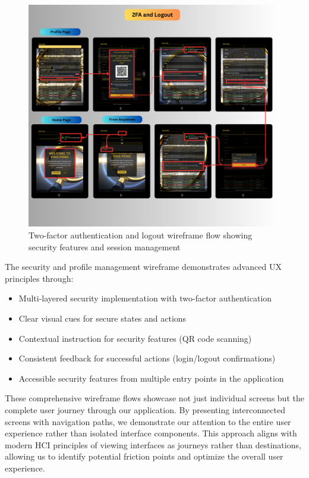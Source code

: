 \begin{figure}[H]
    \centering
    \includegraphics[width=0.9\linewidth]{Figures/images/wireframes/4.png}
    \caption{Two-factor authentication and logout wireframe flow showing security features and session management}
    \label{fig:wireframe-security}
\end{figure}

The security and profile management wireframe demonstrates advanced UX principles through:
\begin{itemize}
    \item Multi-layered security implementation with two-factor authentication
    \item Clear visual cues for secure states and actions
    \item Contextual instruction for security features (QR code scanning)
    \item Consistent feedback for successful actions (login/logout confirmations)
    \item Accessible security features from multiple entry points in the application
\end{itemize}

These comprehensive wireframe flows showcase not just individual screens but the complete user journey through our application. By presenting interconnected screens with navigation paths, we demonstrate our attention to the entire user experience rather than isolated interface components. This approach aligns with modern HCI principles of viewing interfaces as journeys rather than destinations, allowing us to identify potential friction points and optimize the overall user experience.

